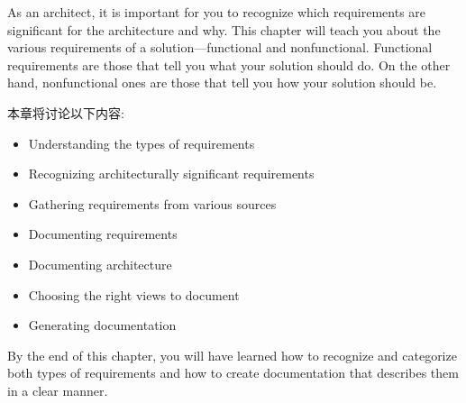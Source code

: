 As an architect, it is important for you to recognize which requirements are significant for the architecture and why. This chapter will teach you about the various requirements of a solution—functional and nonfunctional. Functional requirements are those that tell you what your solution should do. On the other hand, nonfunctional ones are those that tell you how your solution should be.

本章将讨论以下内容:

\begin{itemize}
\item Understanding the types of requirements
\item Recognizing architecturally significant requirements
\item Gathering requirements from various sources
\item Documenting requirements
\item Documenting architecture
\item Choosing the right views to document
\item Generating documentation
\end{itemize}

By the end of this chapter, you will have learned how to recognize and categorize both types of requirements and how to create documentation that describes them in a clear manner.